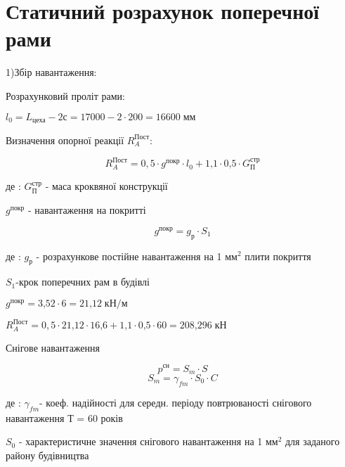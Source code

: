\documentclass[a4paper,14pt]{article}
\begin{document}
\section{Статичний розрахунок поперечної рами}




1)Збір навантаження:


Розрахунковий проліт рами:

$l_0=L_{\textit{цеха}}-2с=17000-2\cdot 200=16600\;{\textit{мм}}$

Визначення опорної реакції $R^{\textit{Пост}}_A$:

\begin{equation}
    R^{\textit{Пост}}_A=0,5\cdot g^{\textit{покр}}\cdot l_0 + {\textit{1,1}}\cdot {\textit{0,5}}\cdot G^{\textit{стр}}_{\textit{П}}
\end{equation}

де : $G^{\textit{стр}}_{\textit{П}}$ - маса кроквяної конструкції

$g^{\textit{покр}}$ - навантаження на покритті

 
\begin{equation}
    g^{\textit{покр}}=g_{\textit{р}}\cdot S_1
\end{equation}

де : $g_{\textit{р}}$ - розрахункове постійне навантаження на 1 м$м^{\textit{2}}$ плити покриття

$S_1$-крок поперечних рам в будівлі

$g^{\textit{покр}}={\textit{3,52}}\cdot 6 = {\textit{21,12}}\;\textit{кН/м}$

$R^{\textit{Пост}}_A=0,5\cdot {\textit{21,12}}\cdot {\textit{16,6}}+ {\textit{1,1}}\cdot {\textit{0,5}}\cdot 60={\textit{208,296}}\;{\textit{кН}}$

Снігове навантаження

\begin{equation}
    p^{\textit{сн}}=S_{\textit{m}}\cdot S
\end{equation}
\begin{equation}
    S_m=\gamma_{fm}\cdot S_0 \cdot C
\end{equation}

де : $\gamma_{fm}$- коеф. надійності для середн. періоду повтрюваності снігового навантаження Т = 60 років 

$S_0$ - характеристичне значення снігового навантаження на 1 м$м^{\textit{2}}$ для заданого району будівництва
\end{document}

